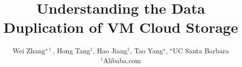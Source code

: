 \documentclass[finalversion]{usetex-v1}
\begin{document}
\title{Understanding the Data Duplication of VM Cloud Storage}
\author{
Wei Zhang$^{\star\dagger}$, Hong Tang$^\dagger$, Hao Jiang$^\dagger$, Tao Yang$^\star$, 
   {\normalsize $^\star$UC Santa Barbara}\\
   {\normalsize$^\dagger$Alibaba.com}
}
\date{}
\maketitle

%


%
%
%
%



{\small


}
\end{document}
